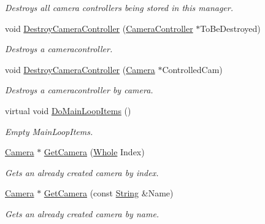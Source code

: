 \begin{DoxyCompactItemize}
\begin{DoxyCompactList}\small\item\em Destroys all camera controllers being stored in this manager. \item\end{DoxyCompactList}\item 
void \hyperlink{classphys_1_1CameraManager_ac600e8911f462476f79404b776db78a6}{DestroyCameraController} (\hyperlink{classphys_1_1CameraController}{CameraController} $\ast$ToBeDestroyed)
\begin{DoxyCompactList}\small\item\em Destroys a cameracontroller. \item\end{DoxyCompactList}\item 
void \hyperlink{classphys_1_1CameraManager_abe794b8f60532d6ac188ed94d00d1c00}{DestroyCameraController} (\hyperlink{classphys_1_1Camera}{Camera} $\ast$ControlledCam)
\begin{DoxyCompactList}\small\item\em Destroys a cameracontroller by camera. \item\end{DoxyCompactList}\item 
virtual void \hyperlink{classphys_1_1CameraManager_aaae22266bccc43f6efa66d2735d7d1d3}{DoMainLoopItems} ()
\begin{DoxyCompactList}\small\item\em Empty MainLoopItems. \item\end{DoxyCompactList}\item 
\hyperlink{classphys_1_1Camera}{Camera} $\ast$ \hyperlink{classphys_1_1CameraManager_a5147ab2269311bec15100953b7505d4b}{GetCamera} (\hyperlink{namespacephys_a460f6bc24c8dd347b05e0366ae34f34a}{Whole} Index)
\begin{DoxyCompactList}\small\item\em Gets an already created camera by index. \item\end{DoxyCompactList}\item 
\hyperlink{classphys_1_1Camera}{Camera} $\ast$ \hyperlink{classphys_1_1CameraManager_ad247bd3789c579cba5edb4c00848ac7c}{GetCamera} (const \hyperlink{namespacephys_aa03900411993de7fbfec4789bc1d392e}{String} \&Name)
\begin{DoxyCompactList}\small\item\em Gets an already created camera by name. \item\end{DoxyCompactList}\item 

\end{DoxyCompactItemize}
